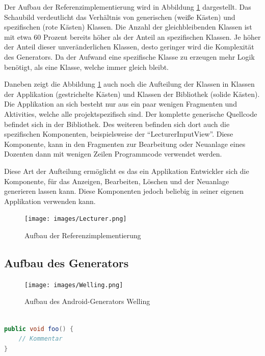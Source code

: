 Der Aufbau der Referenzimplementierung wird in Abbildung \ref{fig:lecturer} dargestellt. Das Schaubild verdeutlicht das Verhältnis von generischen (weiße Kästen) und spezifischen (rote Kästen) Klassen. Die Anzahl der gleichbleibenden Klassen ist mit etwa 60 Prozent bereits höher als der Anteil an spezifischen Klassen. Je höher der Anteil dieser unveränderlichen Klassen, desto geringer wird die Komplexität des Generators. Da der Aufwand eine spezifische Klasse zu erzeugen mehr Logik benötigt, als eine Klasse, welche immer gleich bleibt.

Daneben zeigt die Abbildung \ref{fig:lecturer} auch noch die Aufteilung der Klassen in Klassen der Applikation (gestrichelte Kästen) und Klassen der Bibliothek (solide Kästen). Die Applikation an sich besteht nur aus ein paar wenigen Fragmenten und Aktivities, welche alle projektspezifisch sind. Der komplette generische Quellcode befindet sich in der Bibliothek. Des weiteren befinden sich dort auch die spezifischen Komponenten, beispielsweise der \enquote{LecturerInputView}. Diese Komponente, kann in den Fragmenten zur Bearbeitung oder Neuanlage eines Dozenten dann mit wenigen Zeilen Programmcode verwendet werden.

Diese Art der Aufteilung ermöglicht es das ein Applikation Entwickler sich die Komponente, für das Anzeigen, Bearbeiten, Löschen und der Neuanlage generieren lassen kann. Diese Komponenten jedoch beliebig in seiner eigenen Applikation verwenden kann.

\begin{figure}[H]
	\begin{center}
		\texttt{[image: images/Lecturer.png]}
		\caption{Aufbau der Referenzimplementierung}
		\label{fig:lecturer}
	\end{center}
\end{figure}

\subsection{Aufbau des Generators}


\begin{figure}[H]
	\begin{center}
		\texttt{[image: images/Welling.png]}
		\caption{Aufbau des Android-Generators Welling}
		\label{fig:welling}
	\end{center}
\end{figure}




\begin{lstlisting}[label=lst:java,
				   language=java,
				   firstnumber=1,
				   caption=Beispiel für einen Quelltext]				   

public void foo() {				   
	// Kommentar
}
\end{lstlisting}

